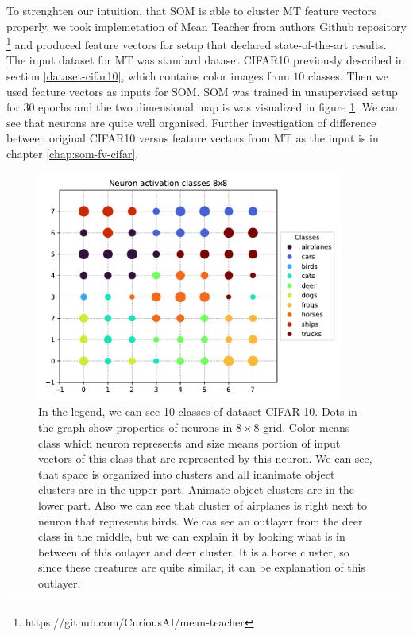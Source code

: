 To strenghten our intuition, that SOM is able to cluster MT feature vectors properly, we took implemetation of Mean Teacher from authors Github repository \footnote{https://github.com/CuriousAI/mean-teacher} and produced feature vectors for setup that declared state-of-the-art results. The input dataset for MT was standard dataset CIFAR10 previously described in section \ref{dataset-cifar10}, which contains color images from $10$ classes. Then we used feature vectors as inputs for SOM. SOM was trained in unsupervised setup for $30$ epochs and the two dimensional map is was visualized in figure \ref{fig:som-cluster-mt}. We can see that neurons are quite well organised. Further investigation of difference between original CIFAR10 versus feature vectors from MT as the input is in chapter \ref{chap:som-fv-cifar}.

\begin{figure}[h!]
    \centering
    \includegraphics[width=0.9\textwidth]{figs/som-clusters-mt.pdf}
    \caption[Som clusters from MT feature vectors]{In the legend, we can see 10 classes of dataset CIFAR-10. Dots in the graph show properties of neurons in $8\times8$ grid. Color means class which neuron represents and size means portion of input vectors of this class that are represented by this neuron. We can see, that space is organized into clusters and all inanimate object clusters are in the upper part. Animate object clusters are in the lower part. Also we can see that cluster of airplanes is right next to neuron that represents birds. We cas see an outlayer from the deer class in the middle, but we can explain it by looking what is in between of this oulayer and deer cluster. It is a horse cluster, so since these creatures are quite similar, it can be explanation of this outlayer.}
    \label{fig:som-cluster-mt}
\end{figure}


